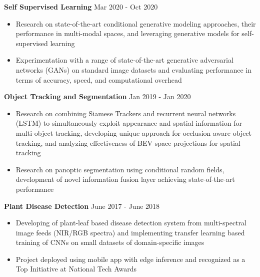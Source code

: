 \documentclass{article}
\begin{document}
{{\textbf{Self Supervised Learning} \hfill Mar 2020 - Oct 2020 \\
\begin{itemize}[leftmargin=*,labelindent=2.5mm,labelsep=1.3mm,topsep=0.1mm, parsep=0.1mm, itemsep=0.5mm]  %
	\item Research on state-of-the-art conditional generative modeling approaches, their performance in multi-modal spaces, and leveraging generative models for self-supervised learning
	\item Experimentation with a range of state-of-the-art generative adversarial networks (GANs) on standard image datasets and evaluating performance in terms of accuracy, speed, and computational overhead
\end{itemize}
\vspace{2mm}

\textbf{Object Tracking and Segmentation} \hfill Jan 2019 - Jan 2020 \\
\begin{itemize}[leftmargin=*,labelindent=2.5mm,labelsep=1.3mm,topsep=0.1mm, parsep=0.1mm, itemsep=0.5mm]  %
	\item Research on combining Siamese Trackers and recurrent neural networks (LSTM) to simultaneously exploit appearance and spatial information for multi-object tracking, developing unique approach for occlusion aware object tracking, and analyzing effectiveness of BEV space projections for spatial tracking
	\item Research on panoptic segmentation using conditional random fields, development of novel information fusion layer achieving state-of-the-art performance
\end{itemize}
\vspace{2mm}

	\textbf{Plant Disease Detection} \hfill June 2017 - June 2018\\
	\begin{itemize}[leftmargin=*,labelindent=2.5mm,labelsep=1.3mm,topsep=0.1mm, parsep=0.1mm, itemsep=0.5mm]  %
	  \item Developing of plant-leaf based disease detection system from multi-spectral image feeds (NIR/RGB spectra) and implementing transfer learning based training of CNNs on small datasets of domain-specific images 
	  \item Project deployed using mobile app with edge inference and recognized as a Top Initiative at National Tech Awards
	\end{itemize}
	\vspace{2mm}

}}
\end{document}
